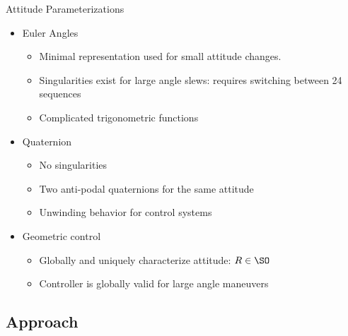 \begin{frame}{Attitude Parameterizations}
    \begin{itemize}
        \item Euler Angles
        \begin{itemize}
            \item Minimal representation used for small attitude changes.
            \item Singularities exist for large angle slews: requires switching between 24 sequences
            \item Complicated trigonometric functions
        \end{itemize}
        \pause
        \vs
        \item Quaternion 
        \begin{itemize}
            \item No singularities
            \item Two anti-podal quaternions for the same attitude
            \item Unwinding behavior for control systems
        \end{itemize}
        \pause
        \vs
        \item Geometric control
        \begin{itemize}
            \item Globally and uniquely characterize attitude: \( R \in \SO \)
            \item Controller is globally valid for large angle maneuvers
        \end{itemize}
    \end{itemize}
    
\end{frame}

\subsection{Approach}

